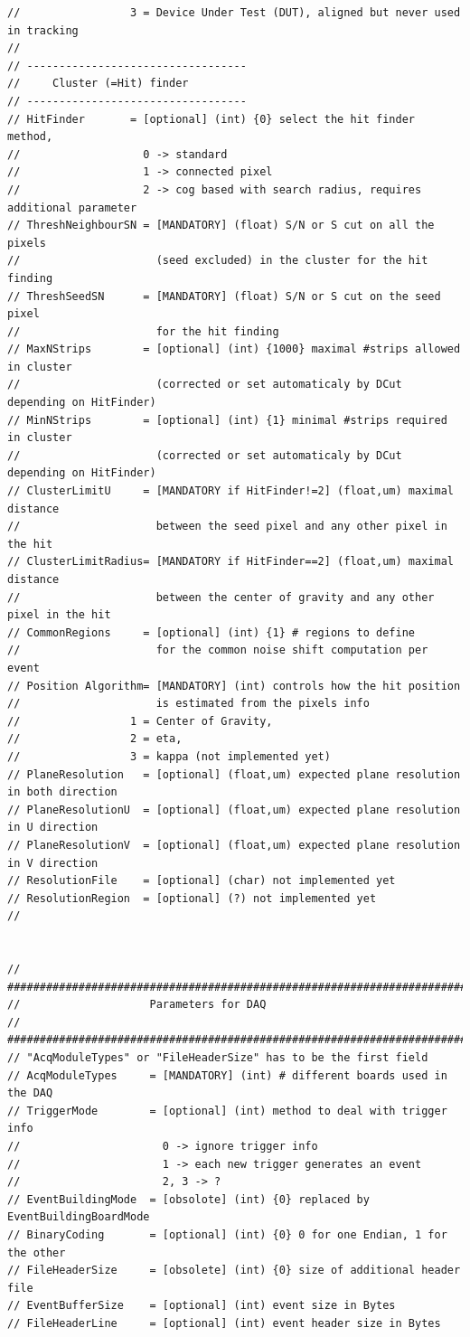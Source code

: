 \documentclass[a4paper, 12pt, twoside]{article}
\begin{document}
\begin{verbatim}
//                 3 = Device Under Test (DUT), aligned but never used in tracking
//
// ----------------------------------
//     Cluster (=Hit) finder
// ----------------------------------
// HitFinder       = [optional] (int) {0} select the hit finder method, 
//                   0 -> standard 
//                   1 -> connected pixel
//                   2 -> cog based with search radius, requires additional parameter
// ThreshNeighbourSN = [MANDATORY] (float) S/N or S cut on all the pixels 
//                     (seed excluded) in the cluster for the hit finding
// ThreshSeedSN      = [MANDATORY] (float) S/N or S cut on the seed pixel 
//                     for the hit finding
// MaxNStrips        = [optional] (int) {1000} maximal #strips allowed in cluster 
//                     (corrected or set automaticaly by DCut depending on HitFinder) 
// MinNStrips        = [optional] (int) {1} minimal #strips required in cluster 
//                     (corrected or set automaticaly by DCut depending on HitFinder) 
// ClusterLimitU     = [MANDATORY if HitFinder!=2] (float,um) maximal distance 
//                     between the seed pixel and any other pixel in the hit
// ClusterLimitRadius= [MANDATORY if HitFinder==2] (float,um) maximal distance 
//                     between the center of gravity and any other pixel in the hit
// CommonRegions     = [optional] (int) {1} # regions to define 
//                     for the common noise shift computation per event
// Position Algorithm= [MANDATORY] (int) controls how the hit position 
//                     is estimated from the pixels info
//                 1 = Center of Gravity,
//                 2 = eta, 
//                 3 = kappa (not implemented yet)
// PlaneResolution   = [optional] (float,um) expected plane resolution in both direction
// PlaneResolutionU  = [optional] (float,um) expected plane resolution in U direction
// PlaneResolutionV  = [optional] (float,um) expected plane resolution in V direction
// ResolutionFile    = [optional] (char) not implemented yet
// ResolutionRegion  = [optional] (?) not implemented yet
//


// #############################################################################
//                    Parameters for DAQ
// #############################################################################
// "AcqModuleTypes" or "FileHeaderSize" has to be the first field
// AcqModuleTypes     = [MANDATORY] (int) # different boards used in the DAQ
// TriggerMode        = [optional] (int) method to deal with trigger info
//                      0 -> ignore trigger info
//                      1 -> each new trigger generates an event
//                      2, 3 -> ?
// EventBuildingMode  = [obsolote] (int) {0} replaced by EventBuildingBoardMode
// BinaryCoding       = [optional] (int) {0} 0 for one Endian, 1 for the other
// FileHeaderSize     = [obsolete] (int) {0} size of additional header file
// EventBufferSize    = [optional] (int) event size in Bytes
// FileHeaderLine     = [optional] (int) event header size in Bytes



\end{verbatim}
\end{document}
